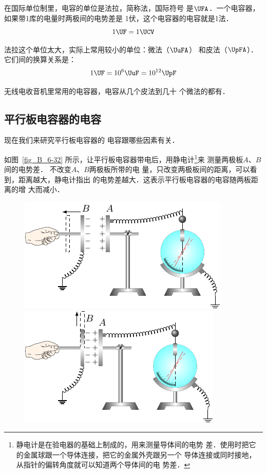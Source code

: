 在国际单位制里，电容的单位是法拉，简称法，国际符号
是$\UFA$．一个电容器，如果带1库的电量时两极间的电势差是
1伏，这个电容器的电容就是1法．
\[1 \UF=1\UCV \]

法拉这个单位太大，实际上常用较小的单位：微法（$\UuFA$）
和皮法（$\UpFA$）．它们间的换算关系是：
\[1 \UF=10^6\UuF=10^{12} \UpF \]

无线电收音机里常用的电容器，电容从几个皮法到几十
个微法的都有．

\subsection{平行板电容器的电容}


现在我们来研究平行板电容器的
电容跟哪些因素有关．

如图~\ref{fig_B_6-32} 所示，让平行板电容器带电后，用静电计\footnote{静电计是在验电器的基础上制成的，用来测量导体间的电势
差．使用时把它的金属球跟一个导体连接，把它的金属外壳跟另一个
导体连接或同时接地，从指针的偏转角度就可以知道两个导体间的电
势差．}来
测量两极板$A$、$B$间的电势差．
不改变$A$、$B$两极板所带的电
量，只改变两极板间的距离，可以看到，距离越大，静电计指出
的电势差越大．这表示平行板电容器的电容随两板距离的增
大而减小．

\begin{figure}[htbp]
    \centering
    \begin{minipage}[t]{0.48\textwidth}
        \centering
        \includegraphics{fig/B/6-32.pdf}
        \caption{}\label{fig_B_6-32}
    \end{minipage}
    \begin{minipage}[t]{0.48\textwidth}
        \centering
        \includegraphics{fig/B/6-33.pdf}
        \caption{}\label{fig_B_6-33}
    \end{minipage}
\end{figure}

